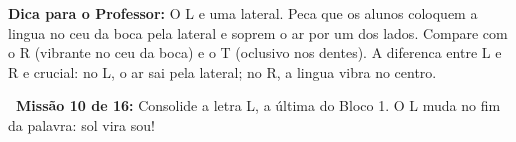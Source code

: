 \begin{dica}
\textbf{Dica para o Professor:} O L e uma lateral. Peca que os alunos coloquem a lingua no ceu da boca pela lateral e soprem o ar por um dos lados. Compare com o R (vibrante no ceu da boca) e o T (oclusivo nos dentes). A diferenca entre L e R e crucial: no L, o ar sai pela lateral; no R, a lingua vibra no centro.
\end{dica}





\begin{missao}
\textbf{\faGamepad~Miss\~a{}o 10 de 16:} Consolide a letra L, a \'ultima do Bloco 1. O L muda no fim da palavra: sol vira sou!
\end{missao}

